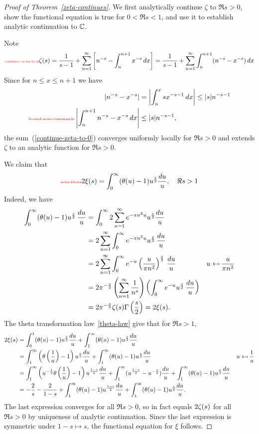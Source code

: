 \begin{proof}[Proof of Theorem~\ref{zeta-continues}]
We first analytically continue $\zeta$ to $\Re s>0$, show the functional equation is true for $0<\Re s<1$, and use it to establish analytic continuation to $\mathbb{C}$.

Note
\begin{equation}\llabel{continue-zeta-to-0}
\zeta(s)=\rc{s-1}+\sum_{n=1}^{\iy}\ba{
n^{-s}-\int_n^{n+1} x^{-s} \,dx
}
=\rc{s-1}+\sum_{n=1}^{\iy} \int_n^{n+1} (n^{-s}-x^{-s})\,dx
\end{equation}
Since for $n\le x\le n+1$ we have
\begin{align}
\nonumber|n^{-s}-x^{-s}|&=\ab{\int_{n}^x sx^{-s-1}\,dx}
\le|s|n^{-s-1}\\
\llabel{bound-zeta-summands}
\ab{\int_n^{n+1} n^{-s}-x^{-s}\,dx}&\le |s|n^{-s-1},
\end{align}
the sum~(\ref{continue-zeta-to-0}) converges uniformly locally for $\Re s>0$ and extends $\zeta$ to an analytic function for $\Re s>0$.

We claim that
\begin{equation}\llabel{zeta-theta}
2\xi(s)=\int_0^{\iy} (\theta(u)-1)u^{\frac s2} \frac{du}{u},\quad \Re s>1
\end{equation}
Indeed, we have
\begin{align*}
\int_0^{\iy} (\theta(u)-1)u^{\frac s2} \,\frac{du}u
&=\int_0^{\iy} 2\sum_{n=1}^{\iy} e^{-\pi n^2u}u^{\frac s2}\frac{du}u\\
&=2\sum_{n=1}^{\iy} \int_0^{\iy} e^{-\pi n^2u}u^{\frac{s}2}\,\frac{du}u\\%
&=2\sum_{n=1}^{\iy} \int_0^{\iy} e^{-u} \pf{u}{\pi n^2}^{\frac s2}\,\frac{du}u&u\mapsfrom \frac{u}{\pi n^2}\\
&=2\pi^{-\frac s2}\pa{\sum_{n=1}^{\iy} \rc{n^s}}\pa{\int_0^{\iy} e^{-u} u^{\frac s2}\,\frac{du}u}\\
&=2\pi^{-\frac s2} \zeta(s)\Ga\pf{s}2=2\xi(s).
\end{align*}
The theta transformation law~\ref{theta-law} give that for $\Re s>1$,
\begin{align*}
2\xi(s)&=\int_0^1 (\theta(u)-1)u^{\frac s2}\frac{du}u
+\int_1^{\iy} (\theta(u)-1)u^{\frac s2} \frac{du}{u}\\
&=%
\int_1^{\iy} \pa{\theta\prc u-1}u^{\frac s2} \frac{du}u +\int_1^{\iy} (\theta(u)-1)u^{\frac s2}\frac{du}u&u\mapsfrom \rc u\\
&=\int_1^{\iy}\pa{u^{-\rc2}\te\prc u-1} u^{\frac{1-s}2}\frac{du}u+\int_1^{\iy}(u^{\fc{1-s}2}-u^{-\fc{s}2})\fc{du}u
+\int_1^{\iy} (\theta(u)-1)u^{\frac s2}\frac{du}u\\
&=-\frac{2}{s}-\frac{2}{1-s}+\int_1^{\iy} (\theta(u)-1)u^{\frac{1-s}2}\frac{du}u+\int_1^{\iy}(\te(u)-1) u^{\frac s2}\frac{du}u.
\end{align*}
The last expression converges for all $\Re s>0$, so in fact equals $2\zeta(s)$ for all $\Re s>0$ by uniqueness of analytic continuation. Since the last expression is symmetric under $1-s\mapsto s$, the functional equation for $\xi$ follows.


\end{proof}
